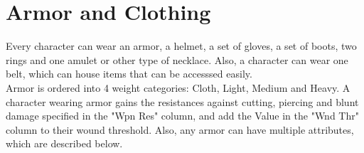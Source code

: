 \section{Armor and Clothing}
Every character can wear an armor, a helmet, a set of gloves, a set of boots, two rings and one amulet or other type of necklace. Also, a character can wear one belt, which can house items that can be accesssed easily.\\
Armor is ordered into 4 weight categories: Cloth, Light, Medium and Heavy. A character wearing armor gains the resistances against cutting, piercing and blunt damage specified in the "Wpn Res" column, and add the Value in the "Wnd Thr" column to their wound threshold. Also, any armor can have multiple attributes, which are described below.\\






















